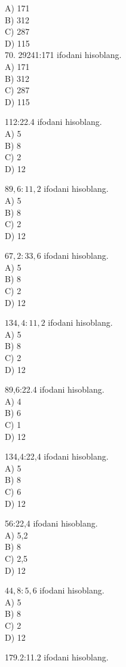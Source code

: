 A) 171\\
B) 312\\
C) 287\\
D) 115\\
70. 29241:171 ifodani hisoblang.\\
A) 171\\
B) 312\\
C) 287\\
D) 115
  \item 112:22.4 ifodani hisoblang.\\
A) 5\\
B) 8\\
C) 2\\
D) 12
  \item $89,6: 11,2$ ifodani hisoblang.\\
A) 5\\
B) 8\\
C) 2\\
D) 12
  \item $67,2: 33,6$ ifodani hisoblang.\\
A) 5\\
B) 8\\
C) 2\\
D) 12
  \item $134,4: 11,2$ ifodani hisoblang.\\
A) 5\\
B) 8\\
C) 2\\
D) 12
  \item 89,6:22.4 ifodani hisoblang.\\
A) 4\\
B) 6\\
C) 1\\
D) 12
  \item 134,4:22,4 ifodani hisoblang.\\
A) 5\\
B) 8\\
C) 6\\
D) 12
  \item 56:22,4 ifodani hisoblang.\\
A) 5,2\\
B) 8\\
C) 2,5\\
D) 12
  \item $44,8: 5,6$ ifodani hisoblang.\\
A) 5\\
B) 8\\
C) 2\\
D) 12
  \item 179.2:11.2 ifodani hisoblang.\\
